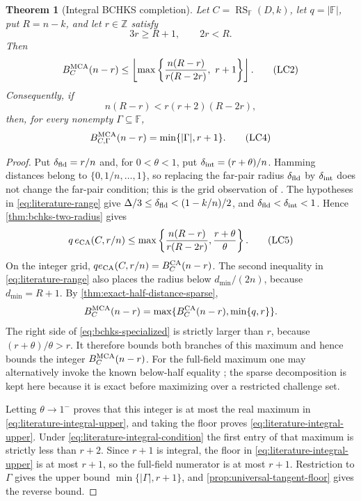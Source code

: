 \documentclass[11pt,a4paper]{amsart}
\numberwithin{equation}{section}
\newtheorem{theorem}{Theorem}[section]
\theoremstyle{remark}
\DeclareMathOperator{\RS}{RS}
\newcommand{\F}{\mathbb F}
\newcommand{\Z}{\mathbb Z}
\newcommand{\abs}[1]{\lvert #1\rvert}
\newcommand{\floor}[1]{\left\lfloor #1\right\rfloor}
\begin{document}
\begin{theorem}[Integral BCHKS completion]
\label{thm:literature-integral-completion}
Let \(C=\RS_\F(D,k)\), let \(q=\abs\F\), put \(R=n-k\), and let
\(r\in\Z\) satisfy
\[
 3r\ge R+1,\qquad 2r<R.                           \tag{LC1}
 \label{eq:literature-range}
\]
Then
\[
 B_C^{\rm MCA}(n-r)
 \le
 \floor{\max\left\{
       \frac{n(R-r)}{r(R-2r)},\ r+1
                  \right\}}.                    \tag{LC2}
 \label{eq:literature-integral-upper}
\]
Consequently, if
\[
             n(R-r)<r(r+2)(R-2r),                \tag{LC3}
 \label{eq:literature-integral-condition}
\]
then, for every nonempty \(\Gamma\subseteq\F\),
\[
 B_{C,\Gamma}^{\rm MCA}(n-r)=\min\{\abs\Gamma,r+1\}.
 \tag{LC4}\label{eq:literature-integral-exact}
\]
\end{theorem}

\begin{proof}
Put \(\delta_{\rm fld}=r/n\) and, for \(0<\theta<1\), put
\(\delta_{\rm int}=(r+\theta)/n\).  Hamming distances belong to
\(\{0,1/n,\ldots,1\}\), so replacing the far-pair radius
\(\delta_{\rm fld}\) by \(\delta_{\rm int}\) does not change the
far-pair condition; this is the grid observation of
\cite[Rem.~4.10]{ABF26}.  The hypotheses in
\eqref{eq:literature-range} give
\(\Delta/3\le\delta_{\rm fld}<(1-k/n)/2\), and
\(\delta_{\rm fld}<\delta_{\rm int}<1\).  Hence
\cref{thm:bchks-two-radius} gives
\[
 q\,e_{\rm CA}(C,r/n)
 \le \max\left\{
  \frac{n(R-r)}{r(R-2r)},\frac{r+\theta}{\theta}
               \right\}.                        \tag{LC5}
 \label{eq:bchks-specialized}
\]
On the integer grid,
\(q e_{\rm CA}(C,r/n)=B_C^{\rm CA}(n-r)\).  The second inequality in
\eqref{eq:literature-range} also places the radius below
\(d_{\min}/(2n)\), because \(d_{\min}=R+1\).  By
\cref{thm:exact-half-distance-sparse},
\[
 B_C^{\rm MCA}(n-r)
   =\max\{B_C^{\rm CA}(n-r),\min\{q,r\}\}.
\]
The right side of \eqref{eq:bchks-specialized} is strictly larger than
\(r\), because \((r+\theta)/\theta>r\).  It therefore bounds both
branches of this maximum and hence bounds the integer
\(B_C^{\rm MCA}(n-r)\).
For the full-field maximum one may alternatively invoke the known
below-half equality \cite[Lem.~4.6]{ABF26}; the sparse decomposition is
kept here because it is exact before maximizing over a restricted
challenge set.

Letting \(\theta\to1^-\) proves that this integer is at most the real
maximum in \eqref{eq:literature-integral-upper}, and taking the floor
proves \eqref{eq:literature-integral-upper}.  Under
\eqref{eq:literature-integral-condition} the first entry of that maximum
is strictly less than \(r+2\).  Since \(r+1\) is integral, the floor in
\eqref{eq:literature-integral-upper} is at most \(r+1\), so the
full-field numerator is at most \(r+1\).
Restriction to \(\Gamma\) gives the upper bound
\(\min\{\abs\Gamma,r+1\}\), and
\cref{prop:universal-tangent-floor} gives the reverse bound.
\end{proof}
\end{document}
